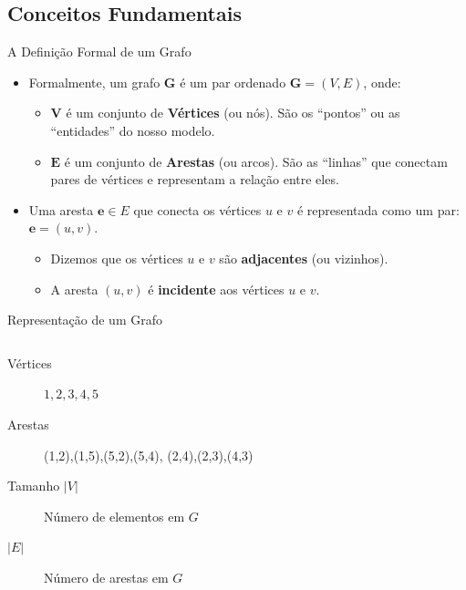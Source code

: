\documentclass[xcolor=table]{beamer}
\begin{document}
\subsection{Conceitos Fundamentais}
\begin{frame}{A Definição Formal de um Grafo}
  \begin{itemize}
    \item Formalmente, um grafo $\mathbf{G}$ é um par ordenado $\mathbf{G} = (V,E)$, onde:
    \begin{itemize}
      \item $\mathbf{V}$ é um conjunto de \textbf{Vértices} (ou nós). São os ``pontos'' ou as ``entidades'' do nosso modelo.
      \item $\mathbf{E}$ é um conjunto de \textbf{Arestas} (ou arcos). São as ``linhas'' que conectam pares de vértices e representam a relação entre eles.
    \end{itemize}
    \vspace{1em}
    \item Uma aresta $\mathbf{e} \in E$ que conecta os vértices $u$ e $v$ é representada como um par: $\mathbf{e} = (u,v)$.
    \begin{itemize}
      \item Dizemos que os vértices $u$ e $v$ são \textbf{adjacentes} (ou vizinhos).
      \item A aresta $(u,v)$ é \textbf{incidente} aos vértices $u$ e $v$.
    \end{itemize}
  \end{itemize}
\end{frame}

\begin{frame}{Representação de um Grafo}
  \begin{columns}
    \footnotesize
    \begin{block}{}
      \begin{description}
        \item[Vértices] $1,2,3,4,5$
        \item[Arestas] (1,2),(1,5),(5,2),(5,4), (2,4),(2,3),(4,3)
        \item[Tamanho $|V|$] Número de elementos em $G$
        \item[$|E|$] Número de arestas em $G$
      \end{description}
    \end{block}
    \centering
  \end{columns}
\end{frame}
\end{document}
